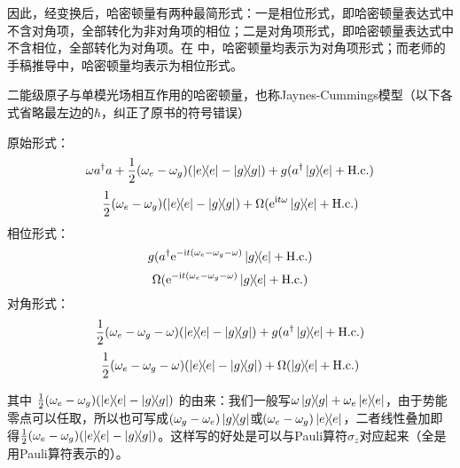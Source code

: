 \documentclass[
fontsetup = font-setup-open.tex,
titlesetup = titles-setup.tex
]{AJbook}
\numberwithin{equation}{section}
\begin{document}
因此，经变换后，哈密顿量有两种最简形式：一是相位形式，即哈密顿量表达式中不含对角项，全部转化为非对角项的相位；二是对角项形式，即哈密顿量表达式中不含相位，全部转化为对角项。在 \cite{PhysRevA.105.032417} 中，哈密顿量均表示为对角项形式；而老师的手稿推导中，哈密顿量均表示为相位形式。
\begin{example}
二能级原子与单模光场相互作用的哈密顿量，也称Jaynes-Cummings模型（以下各式省略最左边的$ \hbar $，纠正了原书的符号错误）\newpage

原始形式：
\begin{equation}\label{key}
\omega a^\dagger a+\frac{1}{2}(\omega_e-\omega_g)(\ketbra{e}{e}-\ketbra{g}{g})+g(a^\dagger \ketbra{g}{e}+\mathrm{H.c.})
\end{equation}
\begin{equation}\label{key}
\frac{1}{2}(\omega_e-\omega_g)(\ketbra{e}{e}-\ketbra{g}{g})+\Omega(\mathrm{e}^{\mathrm{i}t \omega}\ketbra{g}{e}+\mathrm{H.c.})
\end{equation}
相位形式：
\begin{equation}\label{key}
g(a^\dagger\mathrm{e}^{-\mathrm{i}t (\omega_e-\omega_g-\omega)}\ketbra{g}{e}+\mathrm{H.c.})
\end{equation}
\begin{equation}\label{key}
\Omega(\mathrm{e}^{-\mathrm{i}t (\omega_e-\omega_g-\omega)}\ketbra{g}{e}+\mathrm{H.c.})
\end{equation}
对角形式：
\begin{equation}\label{key}
\frac{1}{2}(\omega_e-\omega_g-\omega)(\ketbra{e}{e}-\ketbra{g}{g})+g(a^\dagger \ketbra{g}{e}+\mathrm{H.c.})
\end{equation}
\begin{equation}\label{key}
\frac{1}{2}(\omega_e-\omega_g-\omega)(\ketbra{e}{e}-\ketbra{g}{g})+\Omega(\ketbra{g}{e}+\mathrm{H.c.})
\end{equation}

\begin{table}[]
\end{table}
其中 $ \frac{1}{2}(\omega_e-\omega_g)(\ketbra{e}{e}-\ketbra{g}{g}) $ 的由来：我们一般写$ \omega\ketbra{g}{g}+\omega_e\ketbra{e}{e} $，由于势能零点可以任取，所以也可写成$ (\omega_g-\omega_e)\ketbra{g}{g} $或$ (\omega_e-\omega_g)\ketbra{e}{e} $，二者线性叠加即得$ \frac{1}{2}(\omega_e-\omega_g)(\ketbra{e}{e}-\ketbra{g}{g}) $。这样写的好处是可以与Pauli算符$ \sigma_z $对应起来（\cite{zzmqo}全是用Pauli算符表示的）。
\end{example}
\end{document}
